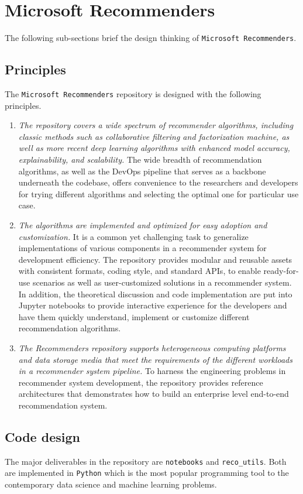 \documentclass[twoside,11pt]{article}
\begin{document}
\section{Microsoft Recommenders}
The following sub-sections brief the design thinking of \verb|Microsoft Recommenders|.

\subsection{Principles}
The \verb|Microsoft Recommenders| repository is designed with the following principles.
\begin{enumerate}
\item \emph{The repository covers a wide spectrum of recommender algorithms, including classic methods such as collaborative filtering and factorization machine, as well as more recent deep learning algorithms with enhanced model accuracy, explainability, and scalability.} The wide breadth of recommendation algorithms, as well as the DevOps pipeline that serves as a backbone underneath the codebase, offers convenience to the researchers and developers for trying different algorithms and selecting the optimal one for particular use case. 
\item \emph{The algorithms are implemented and optimized for easy adoption and customization.} It is a common yet challenging task to generalize implementations of various components in a recommender system for development efficiency. The repository provides modular and reusable assets with consistent formats, coding style, and standard APIs, to enable ready-for-use scenarios as well as user-customized solutions in a recommender system. In addition, the theoretical discussion and code implementation are put into Jupyter notebooks to provide interactive experience for the developers and have them quickly understand, implement or customize different recommendation algorithms. 
\item \emph{The Recommenders repository supports heterogeneous computing platforms and data storage media that meet the requirements of the different workloads in a recommender system pipeline.} To harness the engineering problems in recommender system development, the repository provides reference architectures that demonstrates how to build an enterprise level end-to-end recommendation system.  
\end{enumerate}

\subsection{Code design}
The major deliverables in the repository are \verb|notebooks| and \verb|reco_utils|. Both are implemented in \verb|Python| which is the most popular programming tool to the contemporary data science and machine learning problems.
\end{document}
